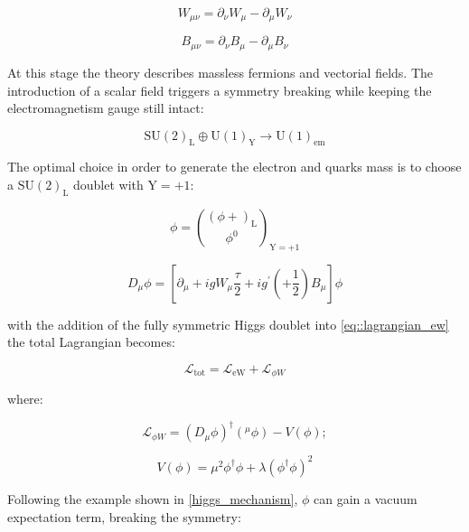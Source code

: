 \begin{equation}
W_{\mu\nu} =\partial_{\nu}W_{\mu} - \partial_{\mu}W_{\nu} 
\end{equation}

\begin{equation}
B_{\mu\nu} =\partial_{\nu}B_{\mu} - \partial_{\mu}B_{\nu} 
\end{equation}

At this stage the theory describes massless fermions and vectorial fields. The introduction of a scalar field triggers a symmetry breaking while keeping the electromagnetism gauge still intact:

\begin{equation}
\text{SU}(2)_{\text{L}} \oplus \text{U}(1)_{\text{Y}} \rightarrow \text{U}(1)_{\text{em}}
\end{equation}

The optimal choice in order to generate the electron and quarks mass is to choose a $\text{SU}(2)_{\text{L}}$ doublet with $\text{Y} = +1$: 

\begin{equation}
\phi = \binom{(\phi{+})_{\text{L}}}{\phi^{0}}_{\text{Y}=+1}
\label{eq::su2_doublet}
\end{equation}

\begin{equation}
D_{\mu}\phi = [\partial_{\mu} + igW_{\mu} \dfrac{\tau}{2}  + ig^{\prime}(+\dfrac{1}{2})B_{\mu}]\phi 
\end{equation}


with the addition of the fully symmetric Higgs doublet into \autoref{eq::lagrangian_ew} the total Lagrangian becomes:

\begin{equation}
\mathcal{L}_{\text{tot}} = \mathcal{L}_{\text{eW}} + \mathcal{L}_{\phi W}
\end{equation}

where:

\begin{equation}
\mathcal{L}_{\phi W} = (D_{\mu}\phi)^{\dagger} (^{\mu}\phi) - V (\phi);
\label{eq::lagrangian_phiW}
\end{equation}

\begin{equation}
V(\phi) = \mu^{2}\phi^{\dagger}\phi + \lambda(\phi^{\dagger}\phi)^{2}
\end{equation}

Following the example shown in \autoref{higgs_mechanism}, $\phi$ can gain a vacuum expectation term, breaking the symmetry:

